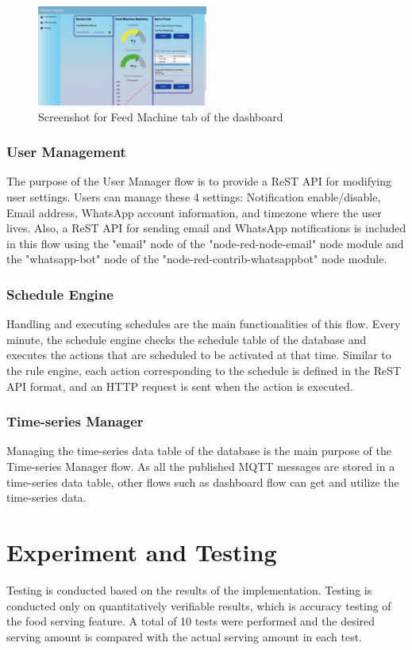 ﻿\documentclass[conference]{IEEEtran}
\begin{document}
\begin{figure}[htbp]
\centerline{\includegraphics[width=0.5\textwidth]{./images/feed_machine_ui.png}}
\caption{Screenshot for Feed Machine tab of the dashboard}
\label{fig}
\end{figure}

\subsubsection{User Management}
The purpose of the User Manager flow is to provide a ReST API for modifying user settings.
Users can manage these 4 settings: Notification enable/disable, Email address, WhatsApp account information, and timezone where the user lives.
Also, a ReST API for sending email and WhatsApp notifications is included in this flow using the "email" node of the "node-red-node-email" node module and the "whatsapp-bot" node of the "node-red-contrib-whatsappbot" node module.

\subsubsection{Schedule Engine}
Handling and executing schedules are the main functionalities of this flow.
Every minute, the schedule engine checks the schedule table of the database and executes the actions that are scheduled to be activated at that time.
Similar to the rule engine, each action corresponding to the schedule is defined in the ReST API format, and an HTTP request is sent when the action is executed.

\subsubsection{Time-series Manager}
Managing the time-series data table of the database is the main purpose of the Time-series Manager flow.
As all the published MQTT messages are stored in a time-series data table, other flows such as dashboard flow can get and utilize the time-series data.

\section{Experiment and Testing}
Testing is conducted based on the results of the implementation.
Testing is conducted only on quantitatively verifiable results, which is accuracy testing of the food serving feature.
A total of 10 tests were performed and the desired serving amount is compared with the actual serving amount in each test.
\end{document}
